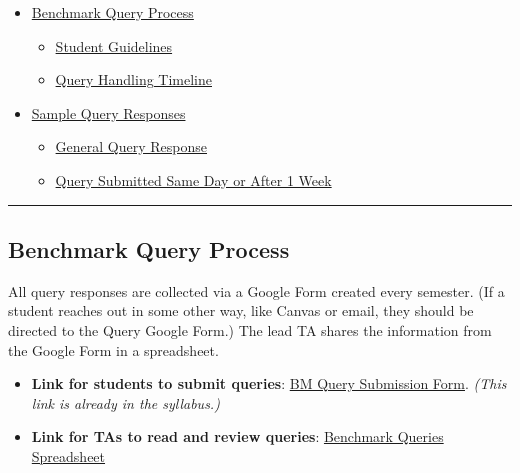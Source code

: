 \documentclass[
]{article}
\providecommand{\tightlist}{%
  \setlength{\itemsep}{0pt}\setlength{\parskip}{0pt}}
\begin{document}
\begin{itemize}
\tightlist
\item
  \protect\hyperlink{benchmark-query-process}{Benchmark Query Process}

  \begin{itemize}
  \tightlist
  \item
    \protect\hyperlink{student-guidelines}{Student Guidelines}\\
  \item
    \protect\hyperlink{query-handling-timeline}{Query Handling Timeline}\\
  \end{itemize}
\item
  \protect\hyperlink{sample-query-responses}{Sample Query Responses}

  \begin{itemize}
  \tightlist
  \item
    \protect\hyperlink{general-query-response}{General Query Response}\\
  \item
    \protect\hyperlink{query-submitted-same-day-or-after-1-week}{Query Submitted Same Day or After 1 Week}
  \end{itemize}
\end{itemize}

\begin{center}\rule{0.5\linewidth}{0.5pt}\end{center}

\hypertarget{benchmark-query-process}{%
\subsection{Benchmark Query Process}\label{benchmark-query-process}}

All query responses are collected via a Google Form created every semester. (If a student reaches out in some other way, like Canvas or email, they should be directed to the Query Google Form.) The lead TA shares the information from the Google Form in a spreadsheet.

\begin{itemize}
\tightlist
\item
  \textbf{Link for students to submit queries}: \href{https://forms.gle/6EjdNQLnpWBTX2H26}{BM Query Submission Form}. \emph{(This link is already in the syllabus.)}\\
\item
  \textbf{Link for TAs to read and review queries}: \href{https://docs.google.com/spreadsheets/d/1eyxaN9Psqle0u9mQ1rSq1LcSYIlrxo-ldgFzc4BlmRk/edit?usp=sharing}{Benchmark Queries Spreadsheet}
\end{itemize}
\end{document}
